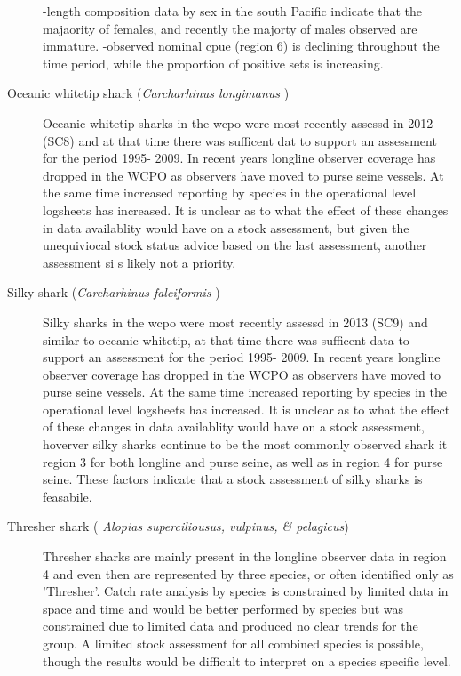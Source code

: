 \documentclass[12pt]{SCreport}
\begin{document}
\begin{description}
 -length composition data by sex in the south Pacific indicate that the majaority of females, and recently the majorty of males observed are immature.
 -observed nominal cpue (region 6) is declining throughout the time period, while the proportion of positive sets is increasing. 
 
 \item[Oceanic whitetip shark (\emph{Carcharhinus longimanus} ) ] Oceanic whitetip sharks in the wcpo were most recently assessd in 2012 (SC8) and at that time there was sufficent dat to support an assessment for the period 1995- 2009.  In recent years longline observer coverage has dropped  in the WCPO as observers have moved to purse seine vessels.  At the same time increased reporting by species in the operational level logsheets has increased.  It is unclear as to what the effect of these changes in data availablity would have on a stock assessment, but given the unequiviocal stock status advice based on the last assessment,  another assessment si s likely not a priority.  

\item[Silky  shark (\emph{Carcharhinus falciformis} ) ] Silky sharks in the wcpo were most recently assessd in 2013 (SC9) and similar to oceanic whitetip, at that time there was sufficent data to support an assessment for the period 1995- 2009.  In recent years longline observer coverage has dropped  in the WCPO as observers have moved to purse seine vessels.  At the same time increased reporting by species in the operational level logsheets has increased.  It is unclear as to what the effect of these changes in data availablity would have on a stock assessment,  hoverver silky sharks continue to be the most commonly observed shark it region 3 for both longline and purse seine, as well as in region 4 for purse seine. These factors indicate that a stock assessment of silky sharks is feasabile.

\item[ Thresher shark (\emph{ Alopias superciliousus, vulpinus, \& pelagicus}) ]  Thresher sharks are mainly present in the longline observer data in region 4 %
and even then are represented by three species, or often identified only as 'Thresher'.   Catch rate analysis by species is constrained by limited data in space and time and would be better performed by species but was constrained due to limited data and produced no clear trends for the group.  A limited stock assessment for all combined species is possible, though the results would be difficult to interpret on a species specific level.


\end{description}
\end{document}
